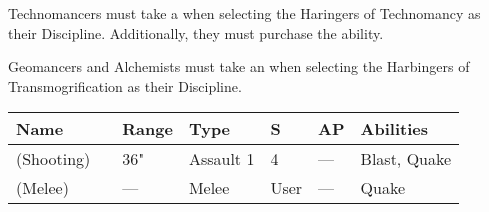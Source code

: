 



Technomancers must take a  when selecting the Haringers of Technomancy as their Discipline. Additionally, they must purchase the  ability.










Geomancers and Alchemists must take an  when selecting the Harbingers of Transmogrification as their Discipline.

\label{Tremorstave}
\noindent
\begin{tabular}{||m{130pt} m{10pt} m{31pt} m{55pt} m{12pt} m{12pt} m{210pt}||}
	\hline
	Name & & Range & Type & S & AP & Abilities \\
	\hline
	\quickref{Tremorstave} (Shooting) & & 36" & Assault 1 & 4 & — & Blast, Quake \\
	\quickref{Tremorstave} (Melee) & & — & Melee & User & — & Quake \\
	\hline
\end{tabular}

